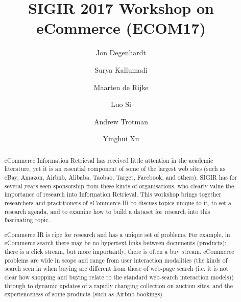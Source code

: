 \documentclass[sigconf]{acmart}
\begin{document}
\title{SIGIR 2017 Workshop on eCommerce (ECOM17)}

\author{Jon Degenhardt}


\author{Surya Kallumadi}

\author{Maarten de Rijke}


\author{Luo Si}

\author{Andrew Trotman}

\author{Yinghui Xu}

\renewcommand{\shortauthors}{J. Degenhardt et al.}


\begin{abstract}
eCommerce Information Retrieval has received little attention in the
academic literature, yet it is an essential component of some of the
largest web sites (such as eBay, Amazon, Airbnb,  Alibaba, Taobao, Target, Facebook, and others).  SIGIR has for
several years seen sponsorship from these kinds of organisations, who clearly value the
importance of research into Information Retrieval.  This
workshop  brings together researchers and practitioners of
eCommerce IR to discuss topics unique to it, to set a research agenda,
and to examine how to build a dataset for research into this fascinating topic.

eCommerce IR is ripe for research and has a unique
set of problems.  For example, in eCommerce search there may be no hypertext links
between documents (products); there is a click stream, but more importantly, there
is often a buy stream.  eCommerce problems are wide in scope and range from user interaction
modalities (the kinds of search seen in when buying are different from those
of web-page search (i.e. it is not clear how shopping and buying relate to the standard
web-search interaction models)) through to dynamic updates of a rapidly
changing collection on auction sites, and the experienceness of some products (such as Airbnb bookings).
\end{abstract}

%
%
\end{document}
